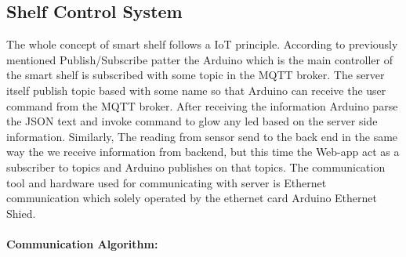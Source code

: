 \subsection{Shelf Control System}
The whole concept of smart shelf follows a IoT principle. According to previously mentioned Publish/Subscribe patter the Arduino which is the main controller of the smart shelf is subscribed with some topic in the MQTT broker. The server itself publish topic based with some name so that Arduino can receive the user command from the MQTT broker. After receiving the information Arduino parse the JSON text and invoke command to glow any led based on the server side information. Similarly, The reading from sensor send to the back end in the same way the we receive information from backend, but this time the Web-app act as a subscriber to topics and Arduino publishes on that topics.  The communication tool and hardware used for communicating with server is Ethernet communication which solely operated by the ethernet card Arduino Ethernet Shied.
\paragraph*{Communication Algorithm: }
